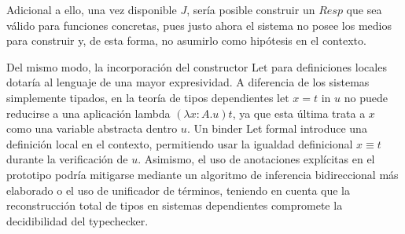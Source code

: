 Adicional a ello, una vez disponible $J$, sería posible construir un $Resp$ que sea válido para funciones concretas, pues justo ahora el sistema no posee los medios para construir y, de esta forma, no asumirlo como hipótesis en el contexto.

Del mismo modo, la incorporación del constructor $\text{Let}$ para definiciones locales dotaría al lenguaje de una mayor expresividad. A diferencia de los sistemas simplemente tipados, en la teoría de tipos dependientes $\text{let } x = t \text{ in } u$ no puede reducirse a una aplicación lambda $(\lambda x : A. u) t$, ya que esta última trata a $x$ como una variable abstracta dentro $u$. Un binder Let formal introduce una definición local en el contexto, permitiendo usar la igualdad definicional $x \equiv t$ durante la verificación de $u$. Asimismo, el uso de anotaciones explícitas en el prototipo podría mitigarse mediante un algoritmo de inferencia bidireccional más elaborado o el uso de unificador de términos, teniendo en cuenta que la reconstrucción total de tipos en sistemas dependientes compromete la decidibilidad del typechecker.

\nocite{*}

\appendix

